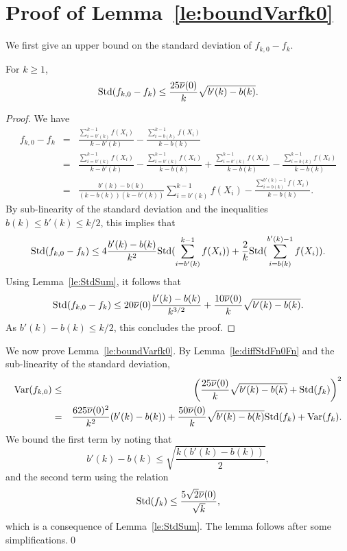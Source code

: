 \documentclass[a4paper,11pt]{article}
\begin{document}
\section{Proof of  Lemma~\ref{le:boundVarfk0}}
We first give an upper bound on the standard deviation of \(f_{k,0}-f_{k}\). \begin{lemma}\label{le:diffStdFn0Fn}For \(k\ge1\), 
\begin{equation*}
{\rm Std}(f_{k,0}-f_{k})\le \frac{25\overline{\nu}(0)}{k}\sqrt{b'(k)-b(k)}.  
\end{equation*}\end{lemma} 
\begin{proof}
We have
\begin{eqnarray*}
f_{k,0}-f_{k} &=&\frac{\sum_{i=b'(k)}^{k-1}f(X_{i})}{k-b'(k)}-\frac{\sum_{i=b(k)}^{k-1}f(X_{i})}{k-b(k)}\\
&=&\frac{\sum_{i=b'(k)}^{k-1}f(X_{i})}{k-b'(k)}-\frac{\sum_{i=b'(k)}^{k-1}f(X_{i})}{k-b(k)}+\frac{\sum_{i=b'(k)}^{k-1}f(X_{i})}{k-b(k)}-\frac{\sum_{i=b(k)}^{k-1}f(X_{i})}{k-b(k)}\\
&=&\frac{b'(k)-b(k)}{(k-b(k))(k-b'(k))}\sum_{i=b'(k)}^{k-1}f(X_{i})-\frac{\sum_{i=b(k)}^{b'(k)-1}f(X_{i})}{k-b(k)}.
\end{eqnarray*}
By sub-linearity of the standard deviation and the inequalities \(b(k)\leq b'(k)\leq k/2\), this implies that\begin{equation*}
{\rm Std}(f_{k,0}-f_{k})\le4\frac{b'(k)-b(k)}{k^{2}}{\rm Std}(\sum_{i=b'(k)}^{k-1}f(X_{i}))+\frac{2}{k}{\rm Std}(\sum_{i=b(k)}^{b'(k)-1}f(X_{i})).
\end{equation*}  Using Lemma~\ref{le:StdSum}, it follows that\begin{equation*}
{\rm Std}(f_{k,0}-f_{k})\le20\overline{\nu}(0)\frac{b'(k)-b(k)}{k^{3/2}}+\frac{10\overline{\nu}(0)}{k}\sqrt{b'(k)-b(k)}.\end{equation*} As  \(  b'(k)-b(k)\le k/2\), this concludes the proof. \end{proof}
We now prove Lemma~\ref{le:boundVarfk0}. By Lemma~\ref{le:diffStdFn0Fn} and the sub-linearity of the standard deviation, \begin{eqnarray*}
{\rm Var}(f_{k,0})&\le&\left(\frac{25\overline{\nu}(0)}{k}\sqrt{b'(k)-b(k)}+{\rm Std}(f_{k})\right)^{2}\\
&=&\frac{625\overline{\nu}(0)^{2}}{k^{2}}(b'(k)-b(k))+\frac{50\overline{\nu}(0)}{k}\sqrt{b'(k)-b(k)}{\rm Std}(f_{k})+{\rm Var}(f_{k}).
\end{eqnarray*}
We bound the first term by noting that\begin{displaymath}
b'(k)-b(k)\leq \sqrt{\frac{k(b'(k)-b(k))}{2}},
\end{displaymath} and the second term using the relation
\begin{equation}\label{eq:StdFnBound}
{\rm Std}(f_{k})\leq\frac{5\sqrt{2}\overline{\nu}(0)}{\sqrt{k}}, 
\end{equation} which is a consequence of Lemma~\ref{le:StdSum}.
The lemma  follows after some simplifications.\qed
\end{document}
